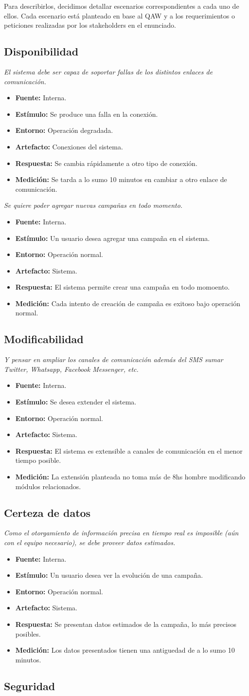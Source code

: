 \documentclass[a4paper, 10pt, twoside]{article}
\newcommand{\escenario}[7] {
  \textit{{#1}}
  \begin{itemize}
    \item \textbf{Fuente:} {#2}
    \item \textbf{Estímulo:} {#3}
    \item \textbf{Entorno:} {#4}
    \item \textbf{Artefacto:} {#5}
    \item \textbf{Respuesta:} {#6}
    \item \textbf{Medición:} {#7}
  \end{itemize}
}
\begin{document}
Para describirlos, decidimos detallar escenarios correspondientes a cada uno de ellos.
Cada escenario está planteado en base al QAW y a los requerimientos o peticiones realizadas por los stakeholders en el enunciado.

\subsection{Disponibilidad}

\escenario{El sistema debe ser capaz de soportar fallas de los distintos enlaces de comunicación.}
    {Interna.}
    {Se produce una falla en la conexión.}
    {Operación degradada.}
    {Conexiones del sistema.}
    {Se cambia rápidamente a otro tipo de conexión.}
    {Se tarda a lo sumo 10 minutos en cambiar a otro enlace de comunicación.}

\escenario{Se quiere poder agregar nuevas campañas en todo momento.}
    {Interna.}
    {Un usuario desea agregar una campaña en el sistema.}
    {Operación normal.}
    {Sistema.}
    {El sistema permite crear una campaña en todo momoento.}
    {Cada intento de creación de campaña es exitoso bajo operación normal.}

\subsection{Modificabilidad}
\label{modificabilidad:atr1}
\escenario{Y pensar en ampliar los canales de comunicación además del SMS sumar Twitter, Whatsapp, Facebook Messenger, etc.}
    {Interna.}
    {Se desea extender el sistema.}
    {Operación normal.}
    {Sistema.}
    {El sistema es extensible a canales de comunicación en el menor tiempo posible.}
    {La extensión planteada no toma más de 8hs hombre modificando módulos relacionados.}


\subsection{Certeza de datos}
\escenario{Como el otorgamiento de información precisa en tiempo real es imposible (aún con el equipo necesario), se debe proveer datos estimados.}
    {Interna.}
    {Un usuario desea ver la evolución de una campaña.}
    {Operación normal.}
    {Sistema.}
    {Se presentan datos estimados de la campaña, lo más precisos posibles.}
    {Los datos presentados tienen una antiguedad de a lo sumo 10 minutos.}

\subsection{Seguridad}
\end{document}
